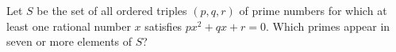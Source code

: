 Let $S$ be the set of all ordered triples $(p,q,r)$ of prime numbers for which at least one rational number $x$ satisfies $px^2+qx+r=0$. Which primes appear in seven or more elements of $S$?